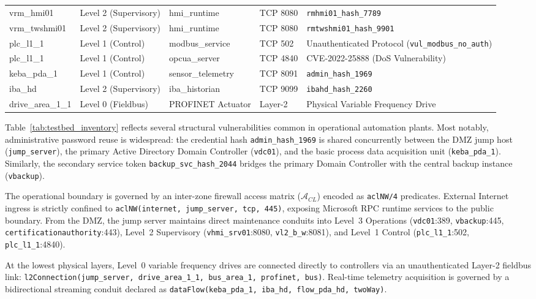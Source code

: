 \documentclass[target=mst,aauheader=aics,style=]{thud}
\begin{document}
\begin{table}[htbp]
\begin{tabularx}{\textwidth}{>{\ttfamily}p{2.6cm} p{2.2cm} >{\ttfamily}p{2.3cm} p{1.6cm} X}
vrm\_hmi01 & Level 2 (Supervisory) & hmi\_runtime & TCP 8080 & \texttt{rmhmi01\_hash\_7789} \\
vrm\_twshmi01 & Level 2 (Supervisory) & hmi\_runtime & TCP 8080 & \texttt{rmtwshmi01\_hash\_9901} \\
plc\_l1\_1 & Level 1 (Control) & modbus\_service & TCP 502 & Unauthenticated Protocol (\texttt{vul\_modbus\_no\_auth}) \\
plc\_l1\_1 & Level 1 (Control) & opcua\_server & TCP 4840 & CVE-2022-25888 (DoS Vulnerability) \\
keba\_pda\_1 & Level 1 (Control) & sensor\_telemetry & TCP 8091 & \texttt{admin\_hash\_1969} \\
iba\_hd & Level 2 (Supervisory) & iba\_historian & TCP 9099 & \texttt{ibahd\_hash\_2260} \\
drive\_area\_1\_1 & Level 0 (Fieldbus) & PROFINET Actuator & Layer-2 & Physical Variable Frequency Drive \\
\bottomrule
\end{tabularx}
\end{table}

Table~\ref{tab:testbed_inventory} reflects several structural vulnerabilities common in operational automation plants. Most notably, administrative password reuse is widespread: the credential hash \texttt{admin\_hash\_1969} is shared concurrently between the DMZ jump host (\texttt{jump\_server}), the primary Active Directory Domain Controller (\texttt{vdc01}), and the basic process data acquisition unit (\texttt{keba\_pda\_1}). Similarly, the secondary service token \texttt{backup\_svc\_hash\_2044} bridges the primary Domain Controller with the central backup instance (\texttt{vbackup}). 

The operational boundary is governed by an inter-zone firewall access matrix ($\mathcal{A}_{CL}$) encoded as \texttt{aclNW/4} predicates. External Internet ingress is strictly confined to \texttt{aclNW(internet, jump\_server, tcp, 445)}, exposing Microsoft RPC runtime services to the public boundary. From the DMZ, the jump server maintains direct maintenance conduits into Level~3 Operations (\texttt{vdc01}:389, \texttt{vbackup}:445, \texttt{certificationauthority}:443), Level~2 Supervisory (\texttt{vhmi\_srv01}:8080, \texttt{vl2\_b\_w}:8081), and Level~1 Control (\texttt{plc\_l1\_1}:502, \texttt{plc\_l1\_1}:4840). 

At the lowest physical layers, Level~0 variable frequency drives are connected directly to controllers via an unauthenticated Layer-2 fieldbus link: \texttt{l2Connection(jump\_server, drive\_area\_1\_1, bus\_area\_1, profinet, bus)}. Real-time telemetry acquisition is governed by a bidirectional streaming conduit declared as \texttt{dataFlow(keba\_pda\_1, iba\_hd, flow\_pda\_hd, twoWay)}.
\end{document}
